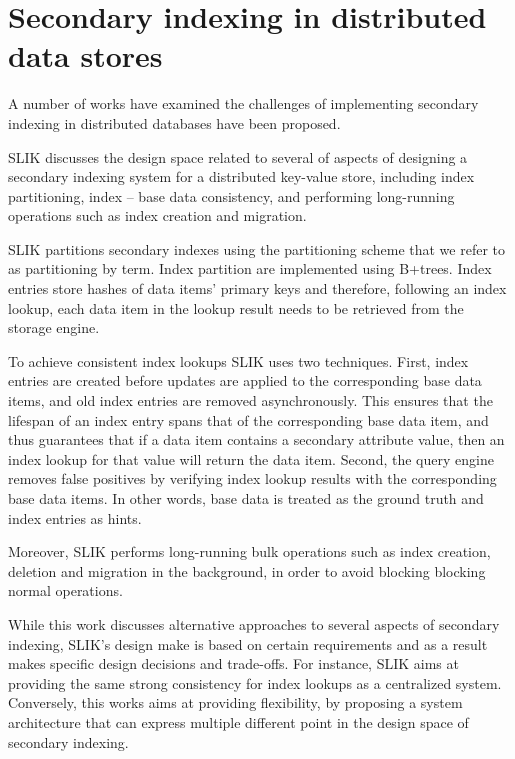 \section{Secondary indexing in distributed data stores}
A number of works \cite{kejriwal:slik, dsilva:tworings, tan:diffindex, tang:deferredindexing}
have examined the challenges of implementing secondary indexing in distributed databases have been proposed.

SLIK \cite{kejriwal:slik} discusses the design space related to several of aspects of designing a secondary indexing system
for a distributed key-value store, including index partitioning, index -- base data consistency,
and performing long-running operations such as index creation and migration.

SLIK partitions secondary indexes using the partitioning scheme that we refer to as partitioning by term.
Index partition are implemented using B+trees.
Index entries store hashes of data items' primary keys and therefore,
following an index lookup, each data item in the lookup result needs to be retrieved from the storage engine.

To achieve consistent index lookups SLIK uses two techniques.
First, index entries are created before updates are applied to the corresponding base data items,
and old index entries are removed asynchronously.
This ensures that the lifespan of an index entry spans that of the corresponding base data item,
and thus guarantees that if a data item contains a secondary attribute value, then an index lookup for that value will
return the data item.
Second, the query engine removes false positives by verifying index lookup results with the corresponding base data items.
In other words, base data is treated as the ground truth and index entries as hints.

Moreover, SLIK performs long-running bulk operations such as index creation, deletion and migration in the background,
in order to avoid blocking blocking normal operations.

While this work discusses alternative approaches to several aspects of secondary indexing,
SLIK's design make is based on certain requirements and as a result makes specific design decisions and trade-offs.
For instance, SLIK aims at providing the same strong consistency for index lookups as a centralized system.
Conversely, this works aims at providing flexibility, by proposing a system architecture that can express multiple
different point in the design space of secondary indexing.

